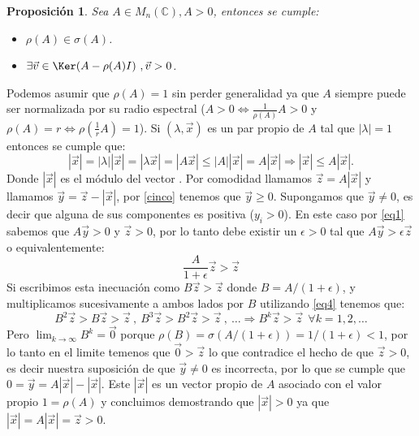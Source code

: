 \documentclass[size=a4, parskip=half, titlepage=false, toc=flat, toc=bib, 12pt, twoside]{scrartcl}
\makeatletter
\renewenvironment{proof}[1][\proofname] {\par\pushQED{\qed}\normalfont\topsep6\p@\@plus6\p@\relax\trivlist\item[\hskip\labelsep\itshape\tgpaella#1\@addpunct{.}]\ignorespaces}{\popQED\endtrivlist\@endpefalse}
\theoremstyle{theorem-style}
\newtheorem{nprop}{Proposición}[section]
\theoremstyle{definition-style}
\theoremstyle{remark-style}
\theoremstyle{example-style}
\theoremstyle{definition-style}
\theoremstyle{remark-style}
\renewcommand{\proofname}{\normalfont\tgpaella\bfseries\small DEMOSTRACIÓN}
\makeatother
\begin{document}
\begin{nprop}
\label{existevector}
Sea $A \in M_n(\mathbb{C}), A > 0$, entonces se cumple:
\begin{itemize}
\item $\rho(A) \in \sigma(A)$.
\item $\exists \vec{v} \in \Ker(A - \rho(A) I) \ , \vec{v} > 0$.
\end{itemize}
\end{nprop}
\begin{proof}
Podemos asumir que $\rho(A) = 1$ sin perder generalidad ya que $A$ siempre puede ser normalizada por su radio espectral ($A >0 \Leftrightarrow \frac{1}{\rho(A)} A > 0$ y $\rho(A) = r \Leftrightarrow \rho(\frac{1}{r}A) = 1$). Si $(\lambda, \vec{x})$ es un par propio de $A$ tal que $|\lambda| = 1$ entonces se cumple que:
\begin{equation} \label{cinco} |\vec{x}| = |\lambda||\vec{x}| = |\lambda \vec{x}| = |A \vec{x}| \leq |A||\vec{x}| = A |\vec{x}| \Rightarrow |\vec{x}| \leq A |\vec{x}|.  \end{equation}
Donde $|\vec{x}|$ es el módulo del vector . Por comodidad llamamos $\vec{z} = A |\vec{x}|$ y llamamos $\vec{y} = \vec{z} - |\vec{x}|$, por \ref{cinco} tenemos que $\vec{y} \geq 0$. Supongamos que $\vec{y} \neq 0$, es decir que alguna de sus componentes es positiva ($y_i > 0$). En este caso por \ref{eq1} sabemos que $A \vec{y} > 0$ y $\vec{z} > 0$, por lo tanto debe existir un $\epsilon >0$ tal que $A\vec{y} > \epsilon \vec{z}$ o equivalentemente:
$$\frac{A}{1 + \epsilon} \vec{z} > \vec{z} $$
Si escribimos esta inecuación como $B \vec{z} > \vec{z}$ donde $B = A /(1 + \epsilon)$, y multiplicamos sucesivamente a ambos lados por $B$ utilizando \ref{eq4} tenemos que:
$$B^2 \vec{z} > B \vec{z} > \vec{z} \ , \ B^3 \vec{z} > B^2 \vec{z} > \vec{z} \ , \ \dots \Rightarrow B^k \vec{z} > \vec{z} \ \ \forall k = 1, 2, \dots $$
Pero $\lim_{k \to \infty}B^k = \vec{0}$ porque $\rho(B) = \sigma(A/(1 + \epsilon)) = 1/(1 + \epsilon) < 1$, por lo tanto en el limite temenos que $\vec{0} > \vec{z}$ lo que contradice el hecho de que $\vec{z} >0$, es decir nuestra suposición de que $\vec{y} \neq 0$ es incorrecta, por lo que se cumple que $0 = \vec{y} = A |\vec{x}| - |\vec{x}|$. Este $|\vec{x}|$ es un vector propio de $A$ asociado con el valor propio $1 = \rho(A)$ y concluimos demostrando que $|\vec{x}|>0$ ya que $|\vec{x}| = A |\vec{x}| = \vec{z} > 0$.
\end{proof}
\end{document}
